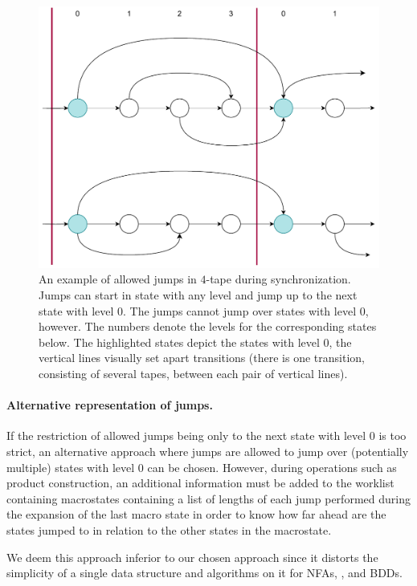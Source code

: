 \begin{figure}[ht]
  \centering
  \includegraphics[scale=0.5, keepaspectratio]{obrazky-figures/jumps_synchronization.drawio.pdf}
  \caption{
    An example of allowed jumps in $4$-tape \nfts during synchronization.
    Jumps can start in state with any level and jump up to the next state with level $0$.
    The jumps cannot jump over states with level $0$, however.
    The numbers denote the levels for the corresponding states below.
    The highlighted states depict the states with level $0$, the vertical lines visually set apart \nft transitions (there is one \nft transition, consisting of several tapes, between each pair of vertical lines).
  }

\end{figure}

\paragraph{Alternative representation of jumps.}
If the restriction of allowed jumps being only to the next state with level $0$ is too strict, an alternative approach where jumps are allowed to jump over (potentially multiple) states with level $0$ can be chosen.
However, during operations such as product construction, an additional information must be added to the worklist containing macrostates containing a list of lengths of each jump performed during the expansion of the last macro state in order to know how far ahead are the states jumped to in relation to the other states in the macrostate.

We deem this approach inferior to our chosen approach since it distorts the simplicity of a single data structure and algorithms on it for NFAs, \nfts, and BDDs.

